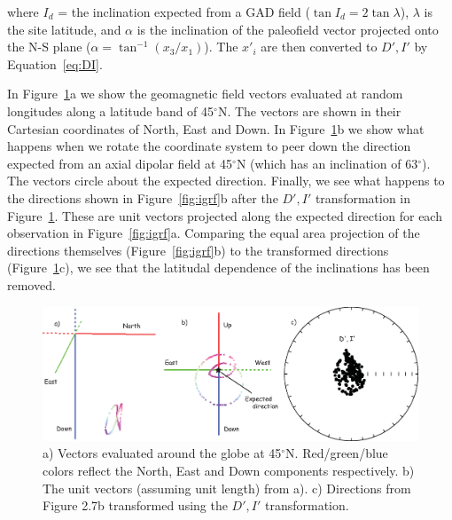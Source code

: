 \noindent
where $I_{d}$ = the inclination expected from a GAD field ($\tan 
I_{d}=2\tan \lambda$),  $\lambda$ is the site latitude, and $\alpha $ 
is the inclination of the paleofield vector projected onto the N-S 
plane ($\alpha = \tan^{-1} (x_{3}/x_{1})$).   The $x'_{i}$ are then 
converted to $D',I'$ by Equation~\ref{eq:DI}. 

In Figure~\ref{fig:didip}a we show the geomagnetic field vectors evaluated at random longitudes along a latitude band of 45$^{\circ}$N.  The vectors are shown in their Cartesian coordinates of North, East and Down.  In Figure~\ref{fig:didip}b we show what happens when we rotate the coordinate system to peer down the direction expected from an axial dipolar field at 45$^{\circ}$N (which has an inclination of 63$^{\circ}$).    The vectors circle about the expected direction.    Finally,   
we see what happens to the directions shown in 
Figure~\ref{fig:igrf}b after the $D',I'$ transformation in Figure~\ref{fig:didip}.   These are unit vectors projected along the expected direction for each observation  in Figure~\ref{fig:igrf}a.   Comparing the equal area projection of the directions themselves (Figure~\ref{fig:igrf}b) to the transformed directions (Figure~\ref{fig:didip}c), we see that the latitudal dependence of the inclinations has been removed. 

\begin{figure}[htb]
\centering  \includegraphics[width=14 cm]{EPSfiles/igrf_dip.eps}
\caption{a) Vectors evaluated around the globe at 45$^{\circ}$N.  Red/green/blue colors reflect the North, East and Down components respectively.  b) The unit vectors  (assuming unit length) from a).  c) Directions from Figure 2.7b transformed using the $D', I'$ transformation.}
\label{fig:didip}
\end{figure}


